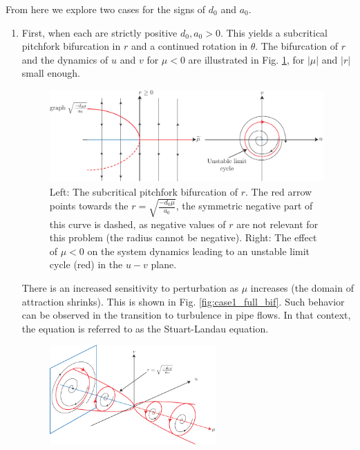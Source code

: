 From here we explore two cases for the signs of $d_0$ and $a_0$.
\begin{enumerate}
	\item First, when each are strictly positive $d_0, a_0 >0$. This yields a subcritical pitchfork bifurcation in $r$ and a continued rotation in $\theta $. The bifurcation of $r$ and the dynamics of $u$ and $v$ for $\mu < 0 $ are illustrated in Fig. \ref{fig:case1_hb}, for $|\mu |$ and $|r|$ small enough.
		\begin{figure}[h!]
			\centering
			\includegraphics[width=0.99\textwidth]{figures/ch3/19case1.pdf}
			\caption{Left: The subcritical pitchfork bifurcation of $r$. The red arrow points towards the $r = \sqrt{\frac{-d_0 \mu }{a_0}}$, the symmetric negative part of this curve is dashed, as negative values of $r$ are not relevant for this problem (the radius cannot be negative). Right: The effect of $\mu <0$ on the system dynamics leading to an unstable limit cycle (red) in the $u-v$ plane.}
			\label{fig:case1_hb}
		\end{figure}
		There is an increased sensitivity to perturbation as $\mu $ increases (the domain of attraction shrinks). This is shown in Fig. \ref{fig:case1_full_bif}. Such behavior can be observed in the transition to turbulence in pipe flows. In that context, the equation is referred to as the Stuart-Landau equation.
		\begin{figure}[h!]
			\centering
			\includegraphics[width=0.6\textwidth]{figures/ch3/21case1_full_bif.pdf}

\end{figure}
\end{enumerate}
